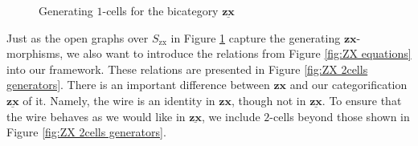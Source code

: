 \documentclass[11pt]{amsart}
\newcommand{\cat}[1]{\mathbf{#1}}
\theoremstyle{remark}
\theoremstyle{definition}
\newcommand{\bicat}[1]{\underline{\mathbf{#1}}}
\begin{document}
\begin{figure}[h]
	\caption{Generating $1$-cells for the bicategory $\bicat{zx}$}
	\label{fig:ZX 1cells generators}
\end{figure} 


Just as the open graphs over $S_{\text{zx}}$ in Figure \ref{fig:ZX 1cells generators} capture the generating $\cat{zx}$-morphisms, we also want to introduce the relations from Figure \ref{fig:ZX equations} into our framework.  These relations are presented in Figure \ref{fig:ZX 2cells generators}. There is an important difference between $\cat{zx}$ and our categorification $\bicat{zx}$ of it.  Namely, the wire is an identity in $\cat{zx}$, though not in $\bicat{zx}$.  To ensure that the wire behaves as we would like in $\bicat{zx}$, we include $2$-cells beyond those shown in Figure \ref{fig:ZX 2cells generators}. 
\end{document}
